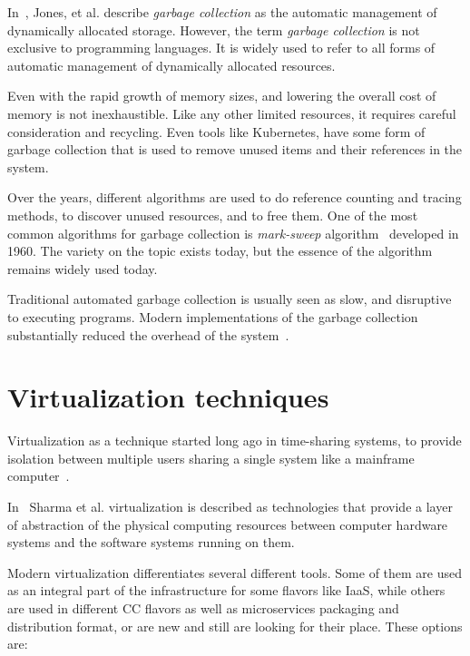 In~\cite{JonesL96}, Jones, et al. describe \emph{garbage collection} as the automatic management of dynamically allocated storage. However, the term \emph{garbage collection} is not exclusive to programming languages. It is widely used to refer to all forms of automatic management of dynamically allocated resources.

Even with the rapid growth of memory sizes, and lowering the overall cost of memory is not inexhaustible. Like any other limited resources, it requires careful consideration and recycling. Even tools like Kubernetes, have some form of garbage collection that is used to remove unused items and their references in the system.

Over the years, different algorithms are used to do reference counting and tracing methods, to discover unused resources, and to free them. One of the most common algorithms for garbage collection is \emph{mark-sweep} algorithm~\cite{McCarthy60} developed in 1960. The variety on the topic exists today, but the essence of the algorithm remains widely used today.

Traditional automated garbage collection is usually seen as slow, and disruptive to executing programs. Modern implementations of the garbage collection substantially reduced the overhead of the system~\cite{JonesL96}.
%
%
\section{Virtualization techniques}\label{sec:virtualization_techniques}
%
Virtualization as a technique started long ago in time-sharing systems, to provide isolation between multiple users sharing a single system like a mainframe computer~\cite{CrosbyB06}. 

In~\cite{Sharma} Sharma et al. virtualization is described as technologies that provide a layer of abstraction of the physical computing resources between computer hardware systems and the software systems running on them.

Modern virtualization differentiates several different tools. Some of them are used as an integral part of the infrastructure for some flavors like IaaS, while others are used in different CC flavors as well as microservices packaging and distribution format, or are new and still are looking for their place. These options are:


